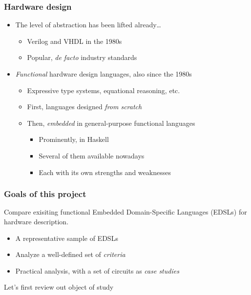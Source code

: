         \begin{frame}
            \frametitle{Hardware design}

            \begin{itemize}
                \item The level of abstraction has been lifted already\ldots
                    \begin{itemize}
                        \item Verilog and VHDL in the 1980s
                        \item Popular, \emph{de facto} industry standards
                    \end{itemize}
                \vspace{0.3cm}
                \item \emph{Functional} hardware design languages, also since the 1980s
                    \begin{itemize}
                        \item Expressive type systems, equational reasoning, etc.
                        \item First, languages designed \emph{from scratch}
                        \item Then, \emph{embedded} in general-purpose functional languages
                            \begin{itemize}
                                \item Prominently, in Haskell
                                \item Several of them available nowadays
                                \item Each with its own strengths and weaknesses
                            \end{itemize}
                    \end{itemize}
            \end{itemize}
        \end{frame}

        \begin{frame}
            \frametitle{Goals of this project}

            \par{Compare exisiting functional Embedded Domain-Specific Languages (EDSLs) for hardware description.}
            \vspace{0.2cm}
            \begin{itemize}
                \item A representative sample of EDSLs
                \item Analyze a well-defined set of \emph{criteria}
                \item Practical analysis, with a set of circuits as \emph{case studies}
            \end{itemize}

            \pause
            \vspace{0.4cm}
            \par{Let's first review out object of study}
        \end{frame}


